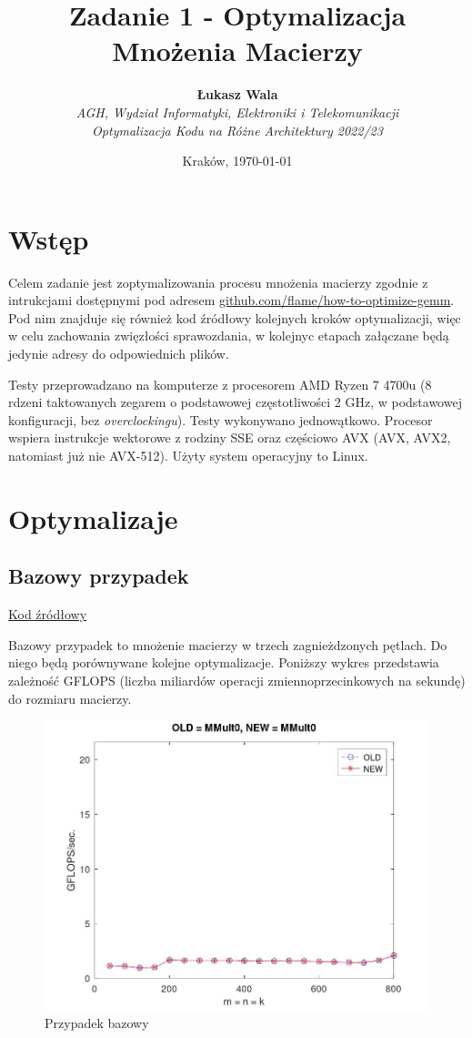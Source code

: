 \documentclass{article}
\title{Zadanie 1 - Optymalizacja Mnożenia Macierzy}
\author{\textbf{Łukasz Wala}\\
    \textit{AGH, Wydział Informatyki, Elektroniki i Telekomunikacji} \\
    \textit{Optymalizacja Kodu na Różne Architektury 2022/23}}
\date{Kraków, \today}
\begin{document}
\maketitle

\section{Wstęp}
Celem zadanie jest zoptymalizowania procesu mnożenia macierzy zgodnie z intrukcjami
dostępnymi pod adresem \url{github.com/flame/how-to-optimize-gemm}. Pod nim znajduje się
również kod źródłowy kolejnych kroków optymalizacji, więc w celu zachowania zwięzłości sprawozdania,
w kolejnyc etapach załączane będą jedynie adresy do odpowiednich plików. 

Testy przeprowadzano na komputerze z procesorem AMD Ryzen 7 4700u (8 rdzeni taktowanych zegarem
o podstawowej częstotliwości 2 GHz, w podstawowej konfiguracji, bez \textit{overclockingu}). Testy
wykonywano jednowątkowo. Procesor wspiera instrukcje wektorowe z rodziny SSE oraz częściowo
AVX (AVX, AVX2, natomiast już nie AVX-512). Użyty system operacyjny to Linux.

\section{Optymalizaje}
\subsection{Bazowy przypadek}

\href{https://github.com/flame/how-to-optimize-gemm/blob/master/src/HowToOptimizeGemm/MMult0.c}{Kod źródłowy}

\noindent Bazowy przypadek to mnożenie macierzy w trzech zagnieżdzonych pętlach. Do niego będą porównywane
kolejne optymalizacje. Poniższy wykres przedstawia zależność GFLOPS (liczba miliardów operacji
zmiennoprzecinkowych na sekundę) do rozmiaru macierzy.

\begin{figure}[H]
    \centering
    \includegraphics[width=1.0\textwidth]{figure1.jpg}
    \caption{Przypadek bazowy}
\end{figure}
\end{document}
